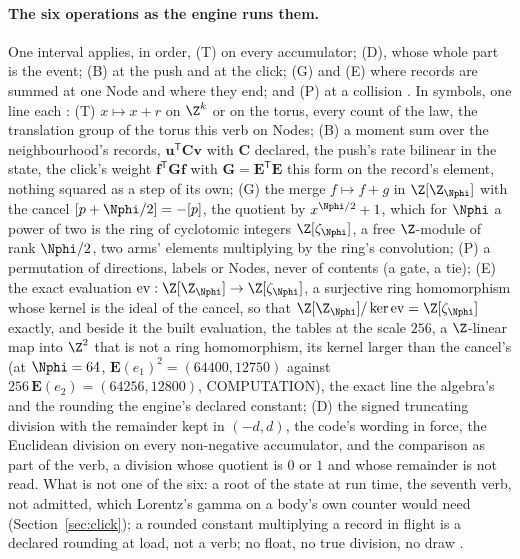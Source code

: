 \paragraph{The six operations as the engine runs them.} One interval applies, in order, (T) on every accumulator; (D), whose whole part is the event; (B) at the push and at the click; (G) and (E) where records are summed at one Node and where they end; and (P) at a collision \cite[2.11]{algebra}. In symbols, one line each \cite[2.1 to 2.6]{algebra}: (T) $x \mapsto x + r$ on $\Z^k$ or on the torus, every count of the law, the translation group of the torus this verb on Nodes; (B) a moment sum over the neighbourhood's records, $\mathbf u^{\mathsf T}\mathbf C\mathbf v$ with $\mathbf C$ declared, the push's rate bilinear in the state, the click's weight $\mathbf f^{\mathsf T}\mathbf G\mathbf f$ with $\mathbf G = \mathbf E^{\mathsf T}\mathbf E$ this form on the record's element, nothing squared as a step of its own; (G) the merge $f \mapsto f + g$ in $\Z[\Z_{\Nphi}]$ with the cancel $[p + \Nphi/2] = -[p]$, the quotient by $x^{\Nphi/2} + 1$, which for $\Nphi$ a power of two is the ring of cyclotomic integers $\Z[\zeta_{\Nphi}]$, a free $\Z$-module of rank $\Nphi/2$, two arms' elements multiplying by the ring's convolution; (P) a permutation of directions, labels or Nodes, never of contents (a gate, a tie); (E) the exact evaluation $\mathrm{ev} : \Z[\Z_{\Nphi}] \to \Z[\zeta_{\Nphi}]$, a surjective ring homomorphism whose kernel is the ideal of the cancel, so that $\Z[\Z_{\Nphi}]/\ker \mathrm{ev} = \Z[\zeta_{\Nphi}]$ exactly, and beside it the built evaluation, the tables at the scale $256$, a $\Z$-linear map into $\Z^2$ that is not a ring homomorphism, its kernel larger than the cancel's (at $\Nphi = 64$, $\mathbf E(e_1)^2 = (64400, 12750)$ against $256\,\mathbf E(e_2) = (64256, 12800)$, COMPUTATION), the exact line the algebra's and the rounding the engine's declared constant; (D) the signed truncating division with the remainder kept in $(-d, d)$, the code's wording in force, the Euclidean division on every non-negative accumulator, and the comparison as part of the verb, a division whose quotient is $0$ or $1$ and whose remainder is not read. What is not one of the six: a root of the state at run time, the seventh verb, not admitted, which Lorentz's gamma on a body's own counter would need (Section~\ref{sec:click}); a rounded constant multiplying a record in flight is a declared rounding at load, not a verb; no float, no true division, no draw \cite[2.7]{algebra}.



